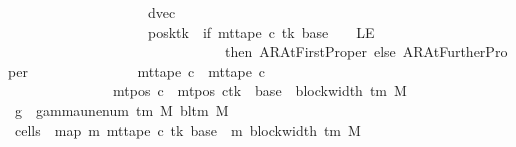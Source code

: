 \begin{isabellebody}
\ \ \ \ \ \ \ \ \ \ \ \ \ \ \ \ \ \ \ \ dvec{\isacharcomma}{\kern0pt}\isanewline
\ \ \ \ \ \ \ \ \ \ \ \ \ \ \ \ \ \ \ \ posk{\isacharparenleft}{\kern0pt}tk\ {\isacharcolon}{\kern0pt}{\isacharequal}{\kern0pt}\ if\ mt{\isacharunderscore}{\kern0pt}tape\ c{\isacharprime}{\kern0pt}\ tk\ {\isacharparenleft}{\kern0pt}base\ {\isacharminus}{\kern0pt}\ {}{\isacharparenright}{\kern0pt}\ {\isacharequal}{\kern0pt}\ LE{}\isanewline
\ \ \ \ \ \ \ \ \ \ \ \ \ \ \ \ \ \ \ \ \ \ \ \ \ \ \ \ \ \ \ then\ AR{\isacharunderscore}{\kern0pt}AtFirstProper\ else\ AR{\isacharunderscore}{\kern0pt}AtFurtherProper{\isacharparenright}{\kern0pt}{\isacharparenright}{\kern0pt}\isanewline
\ \ \ \ \ \ \ \ \ \ \ \ \ \ {\isasymand}\ mt{\isacharunderscore}{\kern0pt}tape\ c{\isacharprime}{\kern0pt}{\isacharprime}{\kern0pt}\ {\isacharequal}{\kern0pt}\ mt{\isacharunderscore}{\kern0pt}tape\ c{\isacharprime}{\kern0pt}\isanewline
\ \ \ \ \ \ \ \ \ \ \ \ \ \ {\isasymand}\ mt{\isacharunderscore}{\kern0pt}pos\ c{\isacharprime}{\kern0pt}{\isacharprime}{\kern0pt}\ {\isacharequal}{\kern0pt}\ {\isacharparenleft}{\kern0pt}mt{\isacharunderscore}{\kern0pt}pos\ c{\isacharprime}{\kern0pt}{\isacharparenright}{\kern0pt}{\isacharparenleft}{\kern0pt}tk\ {\isacharcolon}{\kern0pt}{\isacharequal}{\kern0pt}\ base\ {\isacharplus}{\kern0pt}\ block{\isacharunderscore}{\kern0pt}width\ {\isacharparenleft}{\kern0pt}{\isasymGamma}{\isacharunderscore}{\kern0pt}tm\ M{\isacharparenright}{\kern0pt}{\isacharparenright}{\kern0pt}{\isachardoublequoteclose}\isanewline
%
\isadelimproof
%
\endisadelimproof
%
\isatagproof
{}\isamarkupfalse%
\ {\isacharminus}{\kern0pt}\isanewline
\ \ \isamarkupfalse%
\ {\isacharquery}{\kern0pt}g{}\ {\isacharequal}{\kern0pt}\ {\isachardoublequoteopen}gamma{\isacharunderscore}{\kern0pt}unenum\ {\isacharparenleft}{\kern0pt}{\isasymGamma}{\isacharunderscore}{\kern0pt}tm\ M{\isacharparenright}{\kern0pt}\ {\isacharparenleft}{\kern0pt}bl{\isacharunderscore}{\kern0pt}tm\ M{\isacharparenright}{\kern0pt}\ {}{\isachardoublequoteclose}\isanewline
\ \ \isamarkupfalse%
\ {\isacharquery}{\kern0pt}cells{}\ {\isacharequal}{\kern0pt}\ {\isachardoublequoteopen}map\ {\isacharparenleft}{\kern0pt}{\isasymlambda}m{\isachardot}{\kern0pt}\ mt{\isacharunderscore}{\kern0pt}tape\ c{\isacharprime}{\kern0pt}\ tk\ {\isacharparenleft}{\kern0pt}base\ {\isacharplus}{\kern0pt}\ m{\isacharparenright}{\kern0pt}{\isacharparenright}{\kern0pt}\ {\isacharbrackleft}{\kern0pt}{}{\isachardot}{\kern0pt}{\isachardot}{\kern0pt}{\isacharless}{\kern0pt}block{\isacharunderscore}{\kern0pt}width\ {\isacharparenleft}{\kern0pt}{\isasymGamma}{\isacharunderscore}{\kern0pt}tm\ M{\isacharparenright}{\kern0pt}\ {\isacharminus}{\kern0pt}\ {}{\isacharbrackright}{\kern0pt}{\isachardoublequoteclose}\isanewline

\end{isabellebody}
